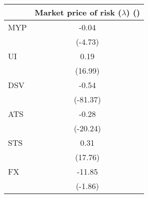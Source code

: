 \begin{tabular}{l*{1}{c}}
\hline
\hline
& Market price of risk ($\lambda$) (\times 100)\\
\hline
MYP & -0.04\\
   & (-4.73)\\
UI & 0.19\\
   & (16.99)\\
DSV & -0.54\\
   & (-81.37)\\
ATS & -0.28\\
   & (-20.24)\\
STS & 0.31\\
   & (17.76)\\
FX & -11.85\\
   & (-1.86)\\
\hline
\hline
\end{tabular}
